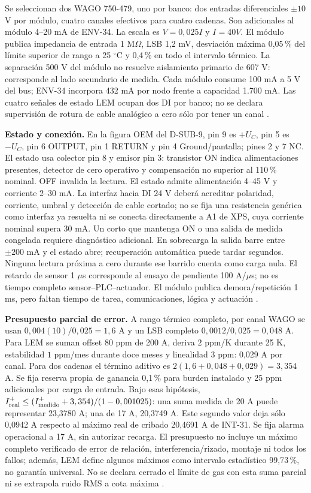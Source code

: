 Se seleccionan dos WAGO 750-479, uno por banco: dos entradas diferenciales $\pm10$ V por módulo, cuatro canales efectivos para cuatro cadenas. Son adicionales al módulo 4--20 mA de ENV-34. La escala es $V=0,025I$ y $I=40V$. El módulo publica impedancia de entrada 1 M$\Omega$, LSB 1,2 mV, desviación máxima 0,05\,\% del límite superior de rango a 25 $^\circ$C y 0,4\,\% en todo el intervalo térmico. La separación 500 V del módulo no resuelve aislamiento primario de 607 V: corresponde al lado secundario de medida. Cada módulo consume 100 mA a 5 V del bus; ENV-34 incorpora 432 mA por nodo frente a capacidad 1.700 mA. Las cuatro señales de estado LEM ocupan dos DI por banco; no se declara supervisión de rotura de cable analógico a cero sólo por tener un canal \parencite[pp.~1--3]{lote35-wago479}.

\textbf{Estado y conexión.} En la figura OEM del D-SUB-9, pin 9 es $+U_C$, pin 5 es $-U_C$, pin 6 OUTPUT, pin 1 RETURN y pin 4 Ground/pantalla; pines 2 y 7 NC. El estado usa colector pin 8 y emisor pin 3: transistor ON indica alimentaciones presentes, detector de cero operativo y compensación no superior al 110\,\% nominal. OFF invalida la lectura. El estado admite alimentación 4--45 V y corriente 2--30 mA. La interfaz hacia DI 24 V deberá acreditar polaridad, corriente, umbral y detección de cable cortado; no se fija una resistencia genérica como interfaz ya resuelta ni se conecta directamente a A1 de XPS, cuya corriente nominal supera 30 mA. Un corto que mantenga ON o una salida de medida congelada requiere diagnóstico adicional. En sobrecarga la salida barre entre $\pm200$ mA y el estado abre; recuperación automática puede tardar segundos. Ninguna lectura próxima a cero durante ese barrido cuenta como carga nula. El retardo de sensor 1 $\mu$s corresponde al ensayo de pendiente 100 A/$\mu$s; no es tiempo completo sensor--PLC--actuador. El módulo publica demora/repetición 1 ms, pero faltan tiempo de tarea, comunicaciones, lógica y actuación \parencites[pp.~5, 7--8 y 10]{lote35-lem200}[pp.~2--3]{lote35-wago479}.

\textbf{Presupuesto parcial de error.} A rango térmico completo, por canal WAGO se usan $0,004(10)/0,025=1,6$ A y un LSB completo $0,0012/0,025=0,048$ A. Para LEM se suman offset $80$ ppm de 200 A, deriva $2$ ppm/K durante 25 K, estabilidad $1$ ppm/mes durante doce meses y linealidad $3$ ppm: 0,029 A por canal. Para dos cadenas el término aditivo es $2(1,6+0,048+0,029)=3,354$ A. Se fija reserva propia de ganancia 0,1\,\% para burden instalado y 25 ppm adicionales por carga de entrada. Bajo esas hipótesis, $I_{\rm real}^{+}\le(I_{\rm medido}^{+}+3,354)/(1-0,001025)$: una suma medida de 20 A puede representar 23,3780 A; una de 17 A, 20,3749 A. Este segundo valor deja sólo 0,0942 A respecto al máximo real de cribado 20,4691 A de INT-31. Se fija alarma operacional a 17 A, sin autorizar recarga. El presupuesto no incluye un máximo completo verificado de error de relación, interferencia/rizado, montaje ni todos los fallos; además, LEM define algunos máximos como intervalo estadístico 99,73\,\%, no garantía universal. No se declara cerrado el límite de gas con esta suma parcial ni se extrapola ruido RMS a cota máxima \parencite[pp.~5--6]{lote35-lem200}.

